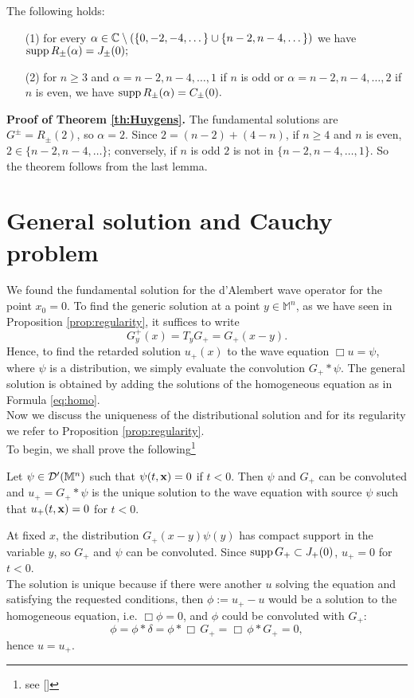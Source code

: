\begin{lem}
	The following holds:
	\begin{enumerate}
	\item[(1)] for every $\alpha\in{\mathbb C}\setminus(\{0,-2,-4,\dots\}\cup\{n-2,n-4,\dots\})$ we have $\text{supp}\,R_\pm(\alpha)=J_\pm(0);$
	\item[(2)] for $n\geq 3$ and $\alpha=n-2,n-4,\dots,1$ if $n$ is odd or $\alpha=n-2,n-4,\dots,2$ if $n$ is even, we have
	$ \text{supp}\,R_\pm(\alpha)=C_\pm(0). $
	\end{enumerate}
\end{lem}

\noindent \textbf{Proof of Theorem \ref{th:Huygens}.} The fundamental solutions are $G^\pm=R_\pm(2)$, so $\alpha=2$. Since $2=(n-2)+(4-n)$, if $n\geq 4$ and $n$ is even, $2\in\{n-2,n-4,\dots\}$; conversely, if $n$ is odd $2$ is not in $\{n-2,n-4,\dots,1\}$. So the theorem follows from the last lemma.\endproof


\section{General solution and Cauchy problem}
\label{sec:cauchymink}

We found the fundamental solution for the d'Alembert wave operator for the point $x_0=0$. To find the generic solution at a point $y\in\mathbb{M}^n$, as we have seen in Proposition \ref{prop:regularity}, it suffices to write
\[G_y^{+}(x)=T_yG_+=G_+(x-y).\]
Hence, to find the retarded solution $u_+(x)$ to the wave equation $\Box u=\psi$, where $\psi$ is a distribution, we simply evaluate the convolution
$G_+*\psi$. 
The general solution is obtained by adding the solutions of the homogeneous equation as in Formula \eqref{eq:homo}.\\

\noindent Now we discuss the uniqueness of the distributional solution and for its regularity we refer to Proposition \ref{prop:regularity}.\\
To begin, we shall prove the following\footnote{see [\citealp[Sec. 5.3]{jonsson}]}
\begin{theorem}
	Let $\psi\in\mathcal{D}'(\mathbb{M}^n)$ such that $\psi(t,\mathbf{x})=0$ if $t<0$. Then $\psi$ and $G_+$ can be convoluted and $u_+=G_+*\psi$ is the unique solution to the wave equation with source $\psi$ such that $u_+(t,\mathbf{x})=0$ for $t<0$.
	
\end{theorem}
\Proof At fixed $x$, the distribution $G_+(x-y)\psi(y)$ has compact support in the variable $y$, so $G_+$ and $\psi$ can be convoluted. Since $\text{supp}\, G_+\subset J_+(0)$, $u_+=0$ for $t<0$.\\
The solution is unique because if there were another $u$ solving the equation and satisfying the requested conditions, then $\phi:=u_+-u$ would be a solution to the homogeneous equation, i.e. $\Box \phi=0$, and $\phi$ could be convoluted with $G_+$:
\[	\phi=\phi*\delta=\phi*\Box\, G_+=\Box\,\phi*G_+=0,		\]
hence $u=u_+$.\endproof\\

